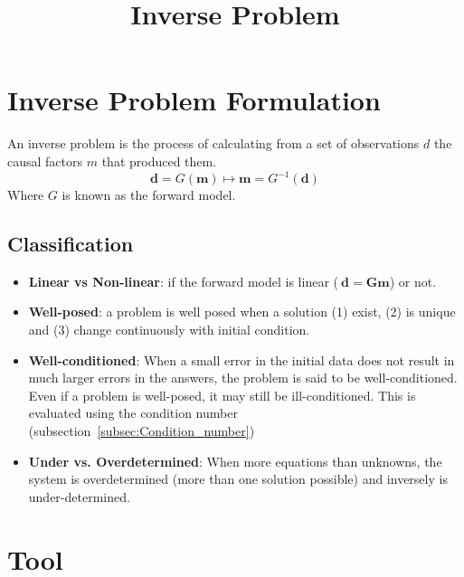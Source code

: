 \documentclass[twocolumn]{article}
\title{Inverse Problem}
\date{\vspace{-6ex}}
\numberwithin{equation}{section}
\begin{document}
\maketitle





\section{Inverse Problem Formulation}
\begin{framed}
An inverse problem is the process of calculating from a set of observations $d$ the causal factors $m$ that produced them.
$$ \mathbf{d} = G(\mathbf{m}) \mapsto \mathbf{m}=G^{-1}(\mathbf{d})$$
Where $G$ is known as the forward model.
\end{framed}



	\subsection{Classification}
\begin{itemize}
	\item \textbf{Linear vs Non-linear}: if the forward model is linear ($\ \mathbf{d} = \mathbf{G}\mathbf{m}$) or not.
	\item \textbf{Well-posed}: a problem is well posed when a solution (1) exist, (2) is unique and (3) change continuously with initial condition.
	\item \textbf{Well-conditioned}: When a small error in the initial data does not result in much larger errors in the answers, the problem is said to be well-conditioned.  Even if a problem is well-posed, it may still be ill-conditioned. This is evaluated using the condition number (subsection~\ref{subsec:Condition_number})
	\item \textbf{Under vs. Overdetermined}: When more equations than unknowns, the system is overdetermined (more than one solution possible) and inversely is under-determined.
\end{itemize}















\newpage
\section{Tool}
\end{document}
